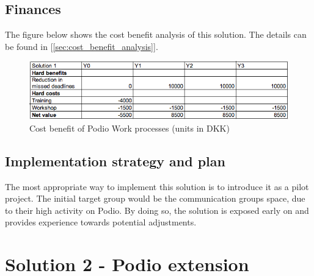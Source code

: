 \subsection{Finances}
The figure below shows the cost benefit analysis of this solution. The details can be found in [\ref{sec:cost_benefit_analysis}].
\begin{figure}[h!]
  \centering
\includegraphics[scale=0.5]{Pictures/cost-benefit1.png}
    \caption{Cost benefit of Podio Work processes (units in DKK)}
\end{figure}

\subsection{Implementation strategy and plan} 
The most appropriate way to implement this solution is to introduce it as a pilot project. The initial target group would be the communication groups space, due to their high activity on Podio. By doing so, the solution is exposed early on and provides experience towards potential adjustments.

\section{Solution 2 - Podio extension}
